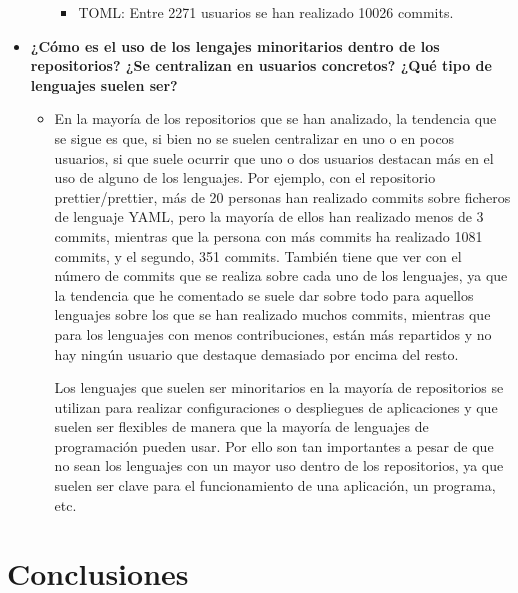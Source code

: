 \documentclass[a4paper, 12pt]{book}
\begin{document}
\begin{itemize}
\begin{itemize}
\begin{itemize}
                  \item TOML: Entre 2271 usuarios se han realizado 10026 commits.
                \end{itemize}
        \end{itemize}
  \item \textbf{¿Cómo es el uso de los lengajes minoritarios dentro de los repositorios? ¿Se centralizan en usuarios concretos? ¿Qué tipo de lenguajes suelen ser?}
        \begin{itemize}
          \item En la mayoría de los repositorios que se han analizado, la tendencia que se sigue es que, si bien no se suelen centralizar en uno o en pocos usuarios, si que suele ocurrir que uno o dos usuarios destacan más en el uso de alguno de los lenguajes. Por ejemplo, con el repositorio prettier/prettier, más de 20 personas han realizado commits sobre ficheros de lenguaje YAML, pero la mayoría de ellos han realizado menos de 3 commits, mientras que la persona con más commits ha realizado 1081 commits, y el segundo, 351 commits. También tiene que ver con el número de commits que se realiza sobre cada uno de los lenguajes, ya que la tendencia que he comentado se suele dar sobre todo para aquellos lenguajes sobre los que se han realizado muchos commits, mientras que para los lenguajes con menos contribuciones, están más repartidos y no hay ningún usuario que destaque demasiado por encima del resto.

                Los lenguajes que suelen ser minoritarios en la mayoría de repositorios se utilizan para realizar configuraciones o despliegues de aplicaciones y que suelen ser flexibles de manera que la mayoría de lenguajes de programación pueden usar. Por ello son tan importantes a pesar de que no sean los lenguajes con un mayor uso dentro de los repositorios, ya que suelen ser clave para el funcionamiento de una aplicación, un programa, etc.
        \end{itemize}
    \end{itemize}


        \cleardoublepage
        \chapter{Conclusiones}
        \label{chap:conclusiones}
\end{document}
